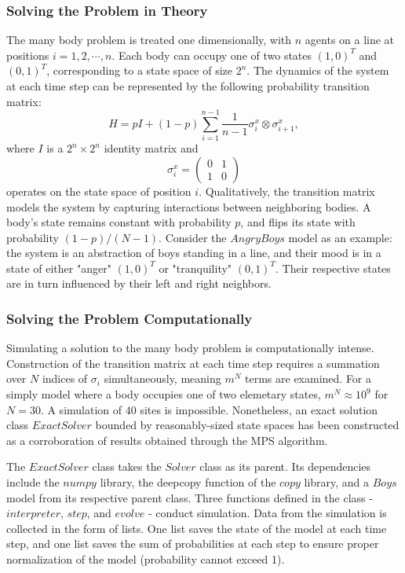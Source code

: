 \subsubsection{Solving the Problem in Theory}
	The many body problem is treated one dimensionally, with $n$ agents on a line at positions $i=1,2,\cdots,n$. Each body can occupy one of two states $(1,0)^T$ and $(0,1)^T$, corresponding to a state space of size $2^n$. The dynamics of the system at each time step can be represented by the following probability transition matrix:
\begin{displaymath}
H = pI + (1-p)\sum_{i=1}^{n-1}\frac{1}{n-1}\sigma_i^x\otimes\sigma_{i+1}^x,
\end{displaymath}
where $I$ is a $2^n\times2^n$ identity matrix and
\begin{displaymath}
\sigma_i^x =
\begin{pmatrix}
0 & 1 \\
1 & 0
\end{pmatrix}
\end{displaymath}
operates on the state space of position $i$.  Qualitatively, the transition matrix models the system by capturing interactions between neighboring bodies. A body's state remains constant with probability $p$, and flips its state with probability  $(1-p)/(N-1)$. Consider the $Angry Boys$ model as an example: the system is an abstraction of boys standing in a line, and their mood is in a state of either  "anger" $(1,0)^T$ or "tranquility" $(0,1)^T$. Their respective states are in turn influenced by their left and right neighbors.

\subsubsection{Solving the Problem Computationally}
	Simulating a solution to the many body problem is computationally intense. Construction of the transition matrix at each time step requires a summation over $N$ indices of $\sigma_{i}$
simultaneously, meaning $m^{N}$ terms are examined. For a simply model where a body occupies one of two elemetary states, $m^{N}\approx10^{9}$ for $N=30$. A simulation of $40$ sites is impossible.  Nonetheless, an exact solution class $ExactSolver$ bounded by reasonably-sized state spaces has been constructed as a corroboration of results obtained through the MPS algorithm.

The $ExactSolver$ class takes the $Solver$ class as its parent. Its dependencies include the $numpy$ library, the deepcopy function of the $copy$ library, and a $Boys$ model from its respective parent class. Three functions defined in the class - $interpreter$, $step$, and $evolve$ - conduct simulation. Data from the simulation is collected in the form of lists. One list saves the state of the model at each time step, and one list saves the sum of probabilities at each step to ensure proper normalization of the model (probability cannot exceed 1).

